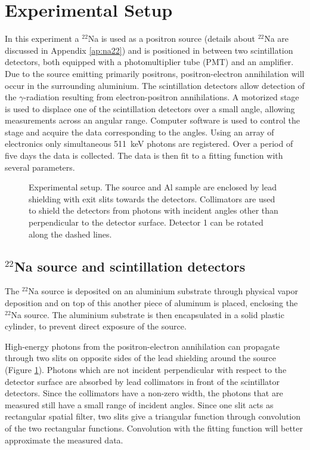 \section{Experimental Setup}
In this experiment a $^{22}$Na is used as a positron source (details about $^{22}$Na are discussed in Appendix \ref{ap:na22}) and is positioned in between two scintillation detectors, both equipped with a photomultiplier tube (PMT) and an amplifier. Due to the source emitting primarily positrons, positron-electron annihilation will occur in the surrounding aluminium. The scintillation detectors allow detection of the $\gamma$-radiation resulting from electron-positron annihilations. A motorized stage is used to displace one of the scintillation detectors over a small angle, allowing measurements across an angular range. Computer software is used to control the stage and acquire the data corresponding to the angles. Using an array of electronics only simultaneous 511~keV photons are registered. Over a period of five days the data is collected. The data is then fit to a fitting function with several parameters.
\begin{figure}[H]
\centering
\resizebox{\columnwidth}{!}{}
\caption{Experimental setup. The source and Al sample are enclosed by lead shielding with exit slits towards the detectors. Collimators are used to shield the detectors from photons with incident angles other than perpendicular to the detector surface. Detector 1 can be rotated along the dashed lines.}
\label{fig:setup}
\end{figure}

\subsection*{$^{22}$Na source and scintillation detectors}
The $^{22}$Na source is deposited on an aluminium substrate through physical vapor deposition and on top of this another piece of aluminum is placed, enclosing the $^{22}$Na source. The aluminium substrate is then encapsulated in a solid plastic cylinder, to prevent direct exposure of the source.

High-energy photons from the positron-electron annihilation can propagate through two slits on opposite sides of the lead shielding around the source (Figure \ref{fig:setup}). Photons which are not incident perpendicular with respect to the detector surface are absorbed by lead collimators in front of the scintillator detectors. Since the collimators have a non-zero width, the photons that are measured still have a small range of incident angles. Since one slit acts as rectangular spatial filter, two slits give a triangular function through convolution of the two rectangular functions. Convolution with the fitting function will better approximate the measured data.


